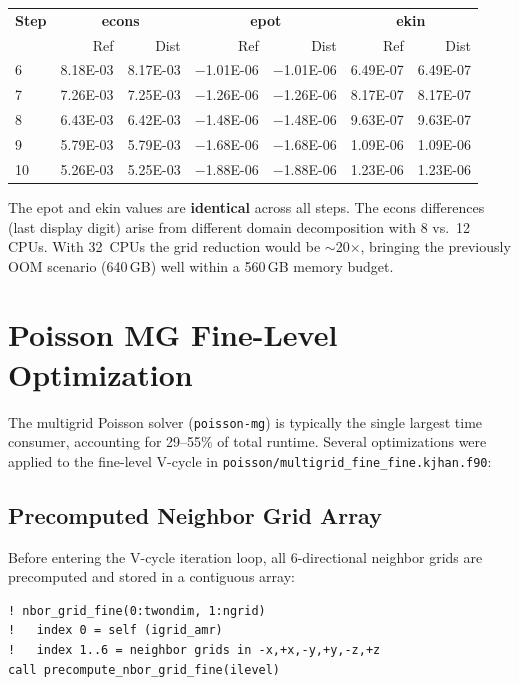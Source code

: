 \documentclass[11pt,fleqn]{book}
\begin{document}
\begin{center}
\begin{tabular}{lrrrrrr}
\toprule
\textbf{Step} & \multicolumn{2}{c}{\textbf{econs}} & \multicolumn{2}{c}{\textbf{epot}} & \multicolumn{2}{c}{\textbf{ekin}} \\
 & Ref & Dist & Ref & Dist & Ref & Dist \\
\midrule
6  & 8.18E-03 & 8.17E-03 & $-$1.01E-06 & $-$1.01E-06 & 6.49E-07 & 6.49E-07 \\
7  & 7.26E-03 & 7.25E-03 & $-$1.26E-06 & $-$1.26E-06 & 8.17E-07 & 8.17E-07 \\
8  & 6.43E-03 & 6.42E-03 & $-$1.48E-06 & $-$1.48E-06 & 9.63E-07 & 9.63E-07 \\
9  & 5.79E-03 & 5.79E-03 & $-$1.68E-06 & $-$1.68E-06 & 1.09E-06 & 1.09E-06 \\
10 & 5.26E-03 & 5.25E-03 & $-$1.88E-06 & $-$1.88E-06 & 1.23E-06 & 1.23E-06 \\
\bottomrule
\end{tabular}
\end{center}

The epot and ekin values are \textbf{identical} across all steps.  The econs differences (last display digit) arise from different domain decomposition with 8 vs.\ 12 CPUs.  With 32~CPUs the grid reduction would be $\sim$20$\times$, bringing the previously OOM scenario (640\,GB) well within a 560\,GB memory budget.


\section{Poisson MG Fine-Level Optimization}

The multigrid Poisson solver (\texttt{poisson-mg}) is typically the single largest time consumer, accounting for 29--55\% of total runtime. Several optimizations were applied to the fine-level V-cycle in \texttt{poisson/multigrid\_fine\_fine.kjhan.f90}:

\subsection{Precomputed Neighbor Grid Array}

Before entering the V-cycle iteration loop, all 6-directional neighbor grids are precomputed and stored in a contiguous array:

\begin{lstlisting}[style=fortran,numbers=none]
! nbor_grid_fine(0:twondim, 1:ngrid)
!   index 0 = self (igrid_amr)
!   index 1..6 = neighbor grids in -x,+x,-y,+y,-z,+z
call precompute_nbor_grid_fine(ilevel)
\end{lstlisting}
\end{document}
